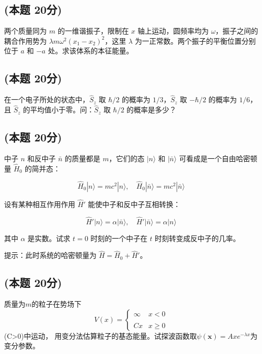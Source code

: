\subsection{(本题 20分)}
两个质量同为 $m$ 的一维谐振子，限制在 $x$ 轴上运动，圆频率均为 $\omega$，振子之间的耦合作用势为 $\lambda m \omega^2 (x_1 - x_2)^2$，这里 $\lambda$ 为一正常数。两个振子的平衡位置分别位于 $a$ 和 $-a$ 处。求该体系的本征能量。
\subsection{(本题 20分)}
在一个电子所处的状态中，$\hat S_z$ 取 $\hbar/2$ 的概率为 $1/3$，$\hat S_z$ 取 $-\hbar/2$ 的概率为 $1/6$，且 $\hat S_z$ 的平均值小于零。问：$\hat S_z$ 取 $\hbar/2$ 的概率是多少？
\subsection{(本题 20分)}
中子 $n$ 和反中子 $\bar{n}$ 的质量都是 $m$，它们的态 $|n\rangle$ 和 $|\bar{n}\rangle$ 可看成是一个自由哈密顿量 $\hat H_0$ 的简并态：

$$\hat H_0|n\rangle = mc^2|n\rangle, \quad \hat H_0|\bar{n}\rangle = mc^2|\bar{n}\rangle~$$

设有某种相互作用作用 $\hat H'$ 能使中子和反中子互相转换：

$$\hat H'|n\rangle = \alpha|\bar{n}\rangle, \quad \hat H'|\bar{n}\rangle = \alpha|n\rangle~$$

其中 $\alpha$ 是实数。试求 $t=0$ 时刻的一个中子在 $t$ 时刻转变成反中子的几率。

提示：此时系统的哈密顿量为 $\hat{H} = \hat{H}_0 + \hat{H}'$。
\subsection{(本题 20分)}
质量为$m$的粒子在势场下$$V(x) = \begin{cases} \infty & x < 0 \\\\ Cx & x \geq 0\end{cases}~$$(C>0)中运动，
用变分法估算粒子的基态能量。试探波函数取$\psi(\mathbf{x}) = A x e^{-\lambda x}$为变分参数。

